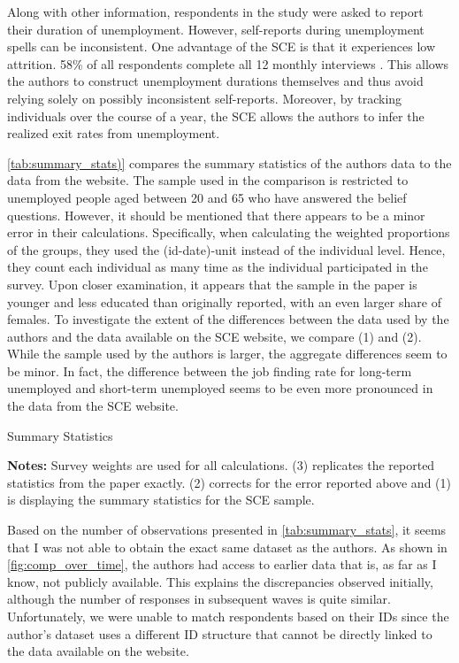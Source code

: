 \documentclass[11pt,a4paper,leqno]{article}
\begin{document}
Along with other information, respondents in the study were asked to report their duration of unemployment. However, self-reports during unemployment spells can be inconsistent.
 One advantage of the SCE is that it experiences low attrition. 58\% of all respondents complete all 12 monthly interviews \parencite{SCEOverview}. This allows the authors to construct unemployment durations themselves and thus avoid relying solely on possibly inconsistent self-reports.  Moreover, by tracking individuals over the course of a year, the SCE allows the authors to infer the realized exit rates from unemployment. 
 
 \autoref{tab:summary_stats)} compares the summary statistics of the authors data to the data from the website. The sample used in the comparison is restricted to unemployed people aged between 20 and 65 who have answered the belief questions. However, it should be mentioned that there appears to be a minor error in their calculations. Specifically, when calculating the weighted proportions of the groups, they used the (id-date)-unit instead of the individual level. Hence, they count each individual as many time as the individual participated in the survey. Upon closer examination, it appears that the sample in the paper is younger and less educated than originally reported, with an even larger share of females. To investigate the extent of the differences between the data used by the authors and the data available on the SCE website, we compare (1) and (2). While the sample used by the authors is larger, the aggregate differences seem to be minor. In fact, the difference between the job finding rate for long-term unemployed and short-term unemployed seems to be even more pronounced in the data from the SCE website.  
 
    \begin{table}[!htbp] 
    \centering 
	\caption{Summary Statistics} \label{tab:summary_stats} 
 	
 	\begin{minipage}[center]{0.7\textwidth}
 	\caption*{\footnotesize \textbf{Notes:} Survey weights are used for all calculations. (3) replicates the reported statistics from the paper exactly. (2) corrects for the error reported above and (1) is displaying the summary statistics for the SCE sample.}
 	\end{minipage}
	\end{table}

Based on the number of observations presented in \autoref{tab:summary_stats}, it seems that I was not able to obtain the exact same dataset as the authors. As shown in \autoref{fig:comp_over_time}, the authors had access to earlier data that is, as far as I know, not publicly available. This explains the discrepancies observed initially, although the number of responses in subsequent waves is quite similar. Unfortunately, we were unable to match respondents based on their IDs since the author's dataset uses a different ID structure that cannot be directly linked to the data available on the website.
\end{document}
